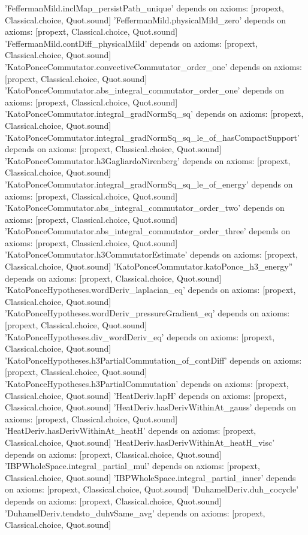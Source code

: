 \documentclass[11pt,a4paper]{article}
\theoremstyle{definition}
\theoremstyle{remark}
\begin{document}
\begin{leancode}
'FeffermanMild.inclMap_persistPath_unique' depends on axioms: [propext, Classical.choice, Quot.sound]
'FeffermanMild.physicalMild_zero' depends on axioms: [propext, Classical.choice, Quot.sound]
'FeffermanMild.contDiff_physicalMild' depends on axioms: [propext, Classical.choice, Quot.sound]
'KatoPonceCommutator.convectiveCommutator_order_one' depends on axioms: [propext, Classical.choice, Quot.sound]
'KatoPonceCommutator.abs_integral_commutator_order_one' depends on axioms: [propext, Classical.choice, Quot.sound]
'KatoPonceCommutator.integral_gradNormSq_sq' depends on axioms: [propext, Classical.choice, Quot.sound]
'KatoPonceCommutator.integral_gradNormSq_sq_le_of_hasCompactSupport' depends on axioms: [propext, Classical.choice, Quot.sound]
'KatoPonceCommutator.h3GagliardoNirenberg' depends on axioms: [propext, Classical.choice, Quot.sound]
'KatoPonceCommutator.integral_gradNormSq_sq_le_of_energy' depends on axioms: [propext, Classical.choice, Quot.sound]
'KatoPonceCommutator.abs_integral_commutator_order_two' depends on axioms: [propext, Classical.choice, Quot.sound]
'KatoPonceCommutator.abs_integral_commutator_order_three' depends on axioms: [propext, Classical.choice, Quot.sound]
'KatoPonceCommutator.h3CommutatorEstimate' depends on axioms: [propext, Classical.choice, Quot.sound]
'KatoPonceCommutator.katoPonce_h3_energy'' depends on axioms: [propext, Classical.choice, Quot.sound]
'KatoPonceHypotheses.wordDeriv_laplacian_eq' depends on axioms: [propext, Classical.choice, Quot.sound]
'KatoPonceHypotheses.wordDeriv_pressureGradient_eq' depends on axioms: [propext, Classical.choice, Quot.sound]
'KatoPonceHypotheses.div_wordDeriv_eq' depends on axioms: [propext, Classical.choice, Quot.sound]
'KatoPonceHypotheses.h3PartialCommutation_of_contDiff' depends on axioms: [propext, Classical.choice, Quot.sound]
'KatoPonceHypotheses.h3PartialCommutation' depends on axioms: [propext, Classical.choice, Quot.sound]
'HeatDeriv.lapH' depends on axioms: [propext, Classical.choice, Quot.sound]
'HeatDeriv.hasDerivWithinAt_gauss' depends on axioms: [propext, Classical.choice, Quot.sound]
'HeatDeriv.hasDerivWithinAt_heatH' depends on axioms: [propext, Classical.choice, Quot.sound]
'HeatDeriv.hasDerivWithinAt_heatH_visc' depends on axioms: [propext, Classical.choice, Quot.sound]
'IBPWholeSpace.integral_partial_mul' depends on axioms: [propext, Classical.choice, Quot.sound]
'IBPWholeSpace.integral_partial_inner' depends on axioms: [propext, Classical.choice, Quot.sound]
'DuhamelDeriv.duh_cocycle' depends on axioms: [propext, Classical.choice, Quot.sound]
'DuhamelDeriv.tendsto_duhνSame_avg' depends on axioms: [propext, Classical.choice, Quot.sound]

\end{leancode}
\end{document}
